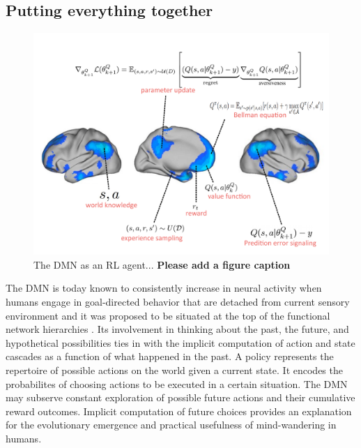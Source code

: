 \documentclass[10pt,letterpaper]{article}
\begin{document}
\subsection{Putting everything together}
\begin{figure}[!h]
  \includegraphics[width=.9\linewidth]{rl_process_chart.pdf}
  \caption{The DMN as an RL agent... \textbf{Please add a figure caption}}
  \label{fig:rl_process_chart}
\end{figure}
The DMN is today known to consistently increase in neural
  activity when humans engage in goal-directed behavior that are detached from
  current sensory environment \citep{kenet2003spontaneously, fiser2004small}
  and it was proposed to be situated at the top of the functional network hierarchies
  \citep{carhart2010default, margulies2016situating}.
  Its involvement in thinking about the past,
  the future, and hypothetical possibilities ties in with the implicit computation of
  action and state cascades as a function of what happened in the past.
  A policy represents the repertoire of possible actions
    on the world given a current state. It encodes the probabilites of
    choosing actions to be executed in a certain situation.
The DMN may subserve
  constant exploration of possible future actions and their
  cumulative reward outcomes. Implicit computation of future choices
  provides an explanation for the
  evolutionary emergence and practical usefulness of mind-wandering
  in humans.
\end{document}
